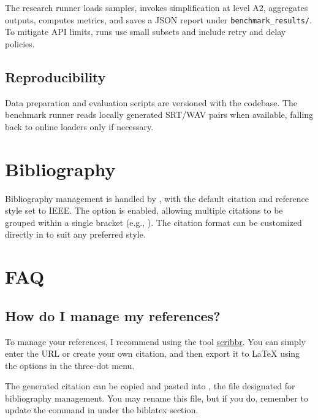 \documentclass[9pt,a4paper,twocolumn,twoside]{rho-class/rho}
\begin{document}
        The research runner loads samples, invokes simplification at level A2, aggregates outputs, computes metrics, and saves a JSON report under \texttt{benchmark\_results/}. To mitigate API limits, runs use small subsets and include retry and delay policies.
    
    \subsection{Reproducibility}
    
        Data preparation and evaluation scripts are versioned with the codebase. The benchmark runner reads locally generated SRT/WAV pairs when available, falling back to online loaders only if necessary.
    
\section{Bibliography}
		
	Bibliography management is handled by , with the default citation and reference style set to IEEE. The  option is enabled, allowing multiple citations to be grouped within a single bracket (e.g., \cite{davis2023signalflow,bell2022codefont}). The citation format can be customized directly in  to suit any preferred style.

\section*{FAQ}

    \subsection*{How do I manage my references?}
        
        To manage your references, I recommend using the tool \href{https://www.scribbr.es/citar/generador/folders/73QOXYsCwMRu4ifQaN65mx/lists/msTfx7GJjIAOUkufbISnA/}{scribbr}. You can simply enter the URL or create your own citation, and then export it to \LaTeX{} using the options in the three-dot menu.
            
        The generated citation can be copied and pasted into , the file designated for bibliography management. You may rename this file, but if you do, remember to update the \inlinecode{} command in  under the biblatex section.
    
\end{document}
